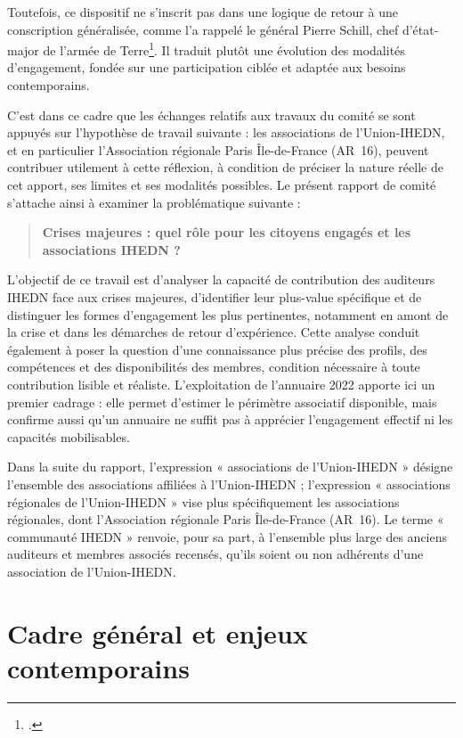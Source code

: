 \documentclass[12pt,a4paper]{article}
\newcommand{\UnionIHEDN}{Union-IHEDN}
\newcommand{\AssociationUnionIHEDN}{association de l'\UnionIHEDN}
\newcommand{\AssociationsUnionIHEDN}{associations de l'\UnionIHEDN}
\newcommand{\AssociationsRegionalesIHEDN}{associations régionales de l'\UnionIHEDN}
\newcommand{\AssociationRegionaleIDF}{Association régionale Paris Île-de-France}
\newcommand{\ARSeize}{AR~16}
\begin{document}
Toutefois, ce dispositif ne s'inscrit pas dans une logique de retour à une conscription généralisée, comme l'a rappelé le général Pierre Schill, chef d'état-major de l'armée de Terre\footcite{leparisien_schill_service_national}. Il traduit plutôt une évolution des modalités d'engagement, fondée sur une participation ciblée et adaptée aux besoins contemporains.

C'est dans ce cadre que les échanges relatifs aux travaux du comité se sont appuyés sur l'hypothèse de travail suivante : les \AssociationsUnionIHEDN, et en particulier l'\AssociationRegionaleIDF{} (\ARSeize), peuvent contribuer utilement à cette réflexion, à condition de préciser la nature réelle de cet apport, ses limites et ses modalités possibles. Le présent rapport de comité s'attache ainsi à examiner la problématique suivante :

\begin{quote}
\textbf{Crises majeures : quel rôle pour les citoyens engagés et les associations IHEDN ?}
\end{quote}

\clearpage

L'objectif de ce travail est d'analyser la capacité de contribution des auditeurs IHEDN face aux crises majeures, d'identifier leur plus-value spécifique et de distinguer les formes d'engagement les plus pertinentes, notamment en amont de la crise et dans les démarches de retour d'expérience. Cette analyse conduit également à poser la question d'une connaissance plus précise des profils, des compétences et des disponibilités des membres, condition nécessaire à toute contribution lisible et réaliste. L'exploitation de l'annuaire 2022 apporte ici un premier cadrage : elle permet d'estimer le périmètre associatif disponible, mais confirme aussi qu'un annuaire ne suffit pas à apprécier l'engagement effectif ni les capacités mobilisables.

Dans la suite du rapport, l'expression « \AssociationsUnionIHEDN{} » désigne l'ensemble des associations affiliées à l'\UnionIHEDN{} ; l'expression « \AssociationsRegionalesIHEDN{} » vise plus spécifiquement les associations régionales, dont l'\AssociationRegionaleIDF{} (\ARSeize). Le terme « communauté IHEDN » renvoie, pour sa part, à l'ensemble plus large des anciens auditeurs et membres associés recensés, qu'ils soient ou non adhérents d'une \AssociationUnionIHEDN.

\clearpage

\section{Cadre général et enjeux contemporains}
\end{document}
